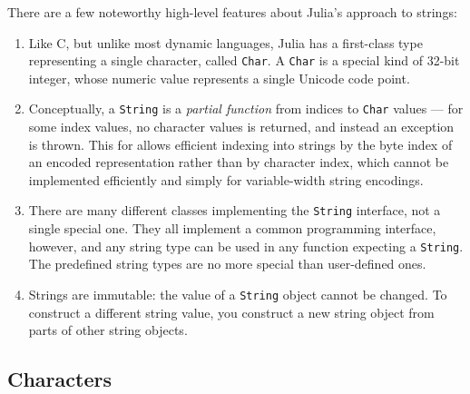 \documentclass{article}
\begin{document}
There are a few noteworthy high-level features about Julia's approach to strings:
\begin{enumerate}
\item Like C, but unlike most dynamic languages, Julia has a first-class type representing a single character, called \verb|Char|.
A \verb|Char| is a special kind of 32-bit integer, whose numeric value represents a single Unicode code point.
\item Conceptually, a \verb|String| is a \emph{partial function} from indices to \verb|Char| values --- for some index values, no character values is returned, and instead an exception is thrown.
This for allows efficient indexing into strings by the byte index of an encoded representation rather than by character index, which cannot be implemented efficiently and simply for variable-width string encodings.
\item There are many different classes implementing the \verb|String| interface, not a single special one.
They all implement a common programming interface, however, and any string type can be used in any function expecting a \verb|String|.
The predefined string types are no more special than user-defined ones.
\item Strings are immutable: the value of a \verb|String| object cannot be changed.
To construct a different string value, you construct a new string object from parts of other string objects.
\end{enumerate}

\subsection{Characters}
\end{document}
